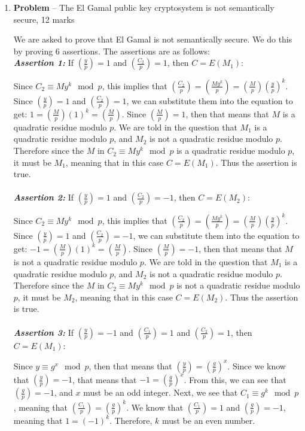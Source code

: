 \documentclass[11pt]{article}
\theoremstyle{definition}
\newcounter{problem}
\providecommand{\Leg}[2]{\genfrac{(}{)}{}{}{#1}{#2}}
\begin{document}
\begin{enumerate}
\newpage

\item[] \textbf{Problem \theproblem} -- The El Gamal public key cryptosystem is not
    semantically secure, 12 marks

We are asked to prove that El Gamal is not semantically secure. We do this by proving 6 assertions. The assertions are as follows: \\

\textbf{\textit{Assertion 1:}} If $\Leg{y}{p} = 1$ and $\Leg{C_2}{p} = 1$, then $C = E(M_1)$:

Since $C_2 \equiv My^k \mod{p}$, this implies that $\Leg{C_2}{p} = \Leg{My^k}{p} = \Leg{M}{p} \Leg{y}{p}^k$. Since $\Leg{y}{p} = 1$ and $\Leg{C_2}{p} = 1$, we can substitute them into the equation to get: $1 = \Leg{M}{p} (1)^k = \Leg{M}{p}$. Since $\Leg{M}{p} = 1$, then that means that $M$ is a quadratic residue modulo $p$. We are told in the question that $M_1$ is a quadratic residue modulo $p$, and $M_2$ is not a quadratic residue modulo $p$. Therefore since the $M$ in $C_2 \equiv My^k \mod{p}$ is a quadratic residue modulo $p$, it must be $M_1$, meaning that in this case $C = E(M_1)$. Thus the assertion is true. \\ \\


\textbf{\textit{Assertion 2:}} If $\Leg{y}{p} = 1$ and $\Leg{C_2}{p} = -1$, then $C = E(M_2)$:

Since $C_2 \equiv My^k \mod{p}$, this implies that $\Leg{C_2}{p} = \Leg{My^k}{p} = \Leg{M}{p} \Leg{y}{p}^k$. Since $\Leg{y}{p} = 1$ and $\Leg{C_2}{p} = -1$, we can substitute them into the equation to get: $-1 = \Leg{M}{p} (1)^k = \Leg{M}{p}$. Since $\Leg{M}{p} = -1$, then that means that $M$ is not a quadratic residue modulo $p$. We are told in the question that $M_1$ is a quadratic residue modulo $p$, and $M_2$ is not a quadratic residue modulo $p$. Therefore since the $M$ in $C_2 \equiv My^k \mod{p}$ is not a quadratic residue modulo $p$, it must be $M_2$, meaning that in this case $C = E(M_2)$. Thus the assertion is true. \\ \\


\textbf{\textit{Assertion 3:}} If $\Leg{y}{p} = -1$ and $\Leg{C_1}{p} = 1$ and $\Leg{C_2}{p} = 1$, then $C = E(M_1)$:

Since $y \equiv g^x \mod{p}$, then that means that $\Leg{y}{p} = \Leg{g}{p}^x$. Since we know that $\Leg{y}{p} = -1$, that means that $-1 = \Leg{g}{p}^x$. From this, we can see that $\Leg{g}{p} = -1$, and $x$ must be an odd integer. Next, we see that $C_1 \equiv g^k \mod{p}$, meaning that $\Leg{C_1}{p} = \Leg{g}{p}^k$. We know that $\Leg{C_1}{p} = 1$ and $\Leg{g}{p} = -1$, meaning that $1 = (-1)^k$. Therefore, $k$ must be an even number. \\


\end{enumerate}
\end{document}
